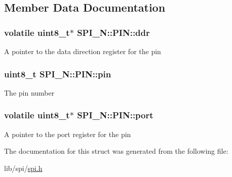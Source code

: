 \subsection{Member Data Documentation}
\subsubsection[{\texorpdfstring{ddr}{ddr}}]{\setlength{\rightskip}{0pt plus 5cm}volatile uint8\+\_\+t$\ast$ S\+P\+I\+\_\+\+N\+::\+P\+I\+N\+::ddr}\hypertarget{struct_s_p_i___n_1_1_p_i_n_a6ccc89a50bb2562bacdd839edd2442c5}{}\label{struct_s_p_i___n_1_1_p_i_n_a6ccc89a50bb2562bacdd839edd2442c5}
A pointer to the data direction register for the pin 
\subsubsection[{\texorpdfstring{pin}{pin}}]{\setlength{\rightskip}{0pt plus 5cm}uint8\+\_\+t S\+P\+I\+\_\+\+N\+::\+P\+I\+N\+::pin}\hypertarget{struct_s_p_i___n_1_1_p_i_n_abb2cb9d43e5af9fe7d59df75aca39b0b}{}\label{struct_s_p_i___n_1_1_p_i_n_abb2cb9d43e5af9fe7d59df75aca39b0b}
The pin number 
\subsubsection[{\texorpdfstring{port}{port}}]{\setlength{\rightskip}{0pt plus 5cm}volatile uint8\+\_\+t$\ast$ S\+P\+I\+\_\+\+N\+::\+P\+I\+N\+::port}\hypertarget{struct_s_p_i___n_1_1_p_i_n_ae1d5f750e364d99dfa888bf2042fa6c2}{}\label{struct_s_p_i___n_1_1_p_i_n_ae1d5f750e364d99dfa888bf2042fa6c2}
A pointer to the port register for the pin 

The documentation for this struct was generated from the following file\+:\begin{DoxyCompactItemize}
\item 
lib/spi/\hyperlink{spi_8h}{spi.\+h}\end{DoxyCompactItemize}
